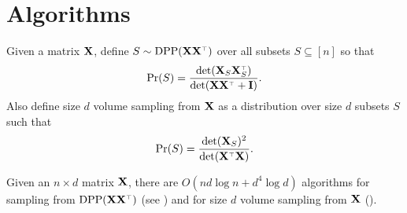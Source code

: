 \documentclass[12pt]{sty/colt2019/colt2018-arxiv}
\begin{document}
\section{Algorithms}
\begin{definition} Given a matrix $\mathbf X$, define $S\sim \DPP(\X\X^\top)$
  over all subsets $S\subseteq [n]$ so
  that \[\Pr(S)=\frac{\det(\X_S\X_S^\top)}{\det(\X\X^\top+\I)}.\] Also
  define size $d$ volume sampling from $\mathbf X$ as a distribution over
  size $d$ subsets $S$ such that
  \[\Pr(S)=\frac{\det(\X_S)^2}{\det(\X^\top\X)}.\]
  \end{definition}
Given an $n\times d$ matrix $\mathbf X$, there are $O(nd\log n+d^4\log d)$ algorithms for
sampling from $\DPP(\X\X^\top)$ (see \cite{dpp-intermediate}) and for
size $d$ volume sampling from $\mathbf X$ (\cite{leveraged-volume-sampling}).
\end{document}
